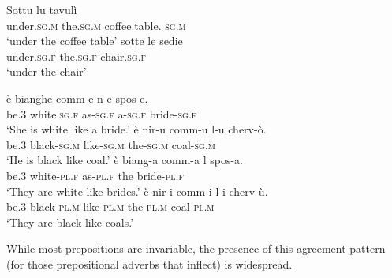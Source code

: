 \documentclass[output=paper
,modfonts
,nonflat]{langsci/langscibook}
\begin{document}
\begin{exe}
	\ex \label{ex-dalessandro:6}\citet[309]{Ledgeway2012} \xlist
	\ex 
	\gll Sottu      lu     tavulì \\
	under.\textsc{sg}.\textsc{m}   the.\textsc{sg}.\textsc{m}  coffee.table. \textsc{sg}.\textsc{m}\\
	\glt `under the coffee table' 
	\ex
	\gll  sotte     le     sedie\\
	under.\textsc{sg}.\textsc{f}  the.\textsc{sg}.\textsc{f}  chair.\textsc{sg}.\textsc{f}\\
	\glt `under the chair' 
	\endxlist
\end{exe}
\begin{exe}
	\ex \label{ex-dalessandro:7}\citet[54]{Lambertelli2003} \xlist
	\ex 
	\gll   è   bianghe   comm-e   n-e   spos-e.\\
	be.\textsc{3}  white.\textsc{sg.f} as-\textsc{sg.f}    a-\textsc{sg.f}  bride-\textsc{sg.f}\\
	\glt `She is white like a bride.' 
	\ex
	\gll  è   nir-u     comm-u   l-u     cherv-ò.\\
	be.3  black-\textsc{sg.m} like-\textsc{sg.m} the-\textsc{sg.m} coal-\textsc{sg.m}\\
	\glt `He is black like coal.' 
	\ex
	\gll  è  biang-a    comm-a  l  spos-a.\\
	be.3  white-\textsc{pl.f} as-\textsc{pl.f}    the  bride-\textsc{pl.f}\\
	\glt `They are white like brides.' 
	\ex
	\gll  è   nir-i     comm-i  l-i     cherv-ù.\\
	be.3   black-\textsc{pl.m} like-\textsc{pl.m} the-\textsc{pl.m} coal-\textsc{pl.m}\\
	\glt `They are black like coals.'
	\endxlist
\end{exe}
While most prepositions are invariable, the presence of this agreement pattern (for those prepositional adverbs that inflect) is widespread.
\end{document}
